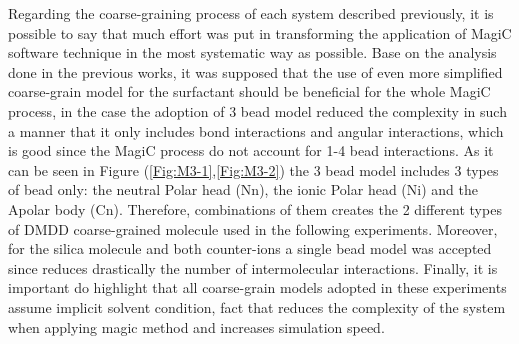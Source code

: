 \documentclass[10pt,a4paper,twoside]{article}
\begin{document}
Regarding the coarse-graining process of each system described previously, it is possible to say that much effort was put in transforming the application of MagiC software technique in the most systematic way as possible.  Base on the analysis done in the previous works, it was supposed that the use of even more simplified coarse-grain model for the surfactant should be beneficial for the whole MagiC process, in the case the adoption of 3 bead model reduced the complexity in such a manner that it only includes bond interactions and angular interactions, which is good since the MagiC process do not account for 1-4 bead interactions. As it can be seen in Figure (\ref{Fig:M3-1},\ref{Fig:M3-2}) the 3 bead model includes 3 types of bead only: the neutral Polar head (Nn), the ionic Polar head (Ni) and the Apolar body (Cn). Therefore, combinations of them creates the 2 different types of DMDD coarse-grained molecule used in the following experiments. Moreover, for the silica molecule and both counter-ions a single bead model was accepted since reduces drastically the number of intermolecular interactions. Finally, it is important do highlight that all coarse-grain models adopted in these experiments assume implicit solvent condition, fact that reduces the complexity of the system when applying magic method and increases simulation speed.
\end{document}
